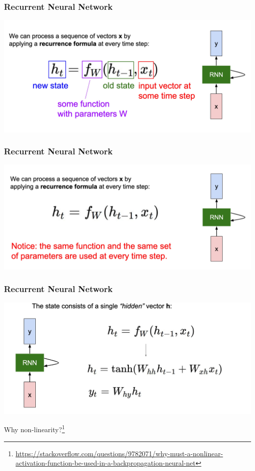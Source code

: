 \documentclass[aspectratio=1610]{beamer} %
\begin{document}
\begin{frame}

\frametitle{Recurrent Neural Network}

\begin{center}
\includegraphics[width=1\textwidth]{pics/rnnhow3}
\end{center}

\end{frame}


\begin{frame}

\frametitle{Recurrent Neural Network}

\begin{center}
\includegraphics[width=\textwidth]{pics/rnnhow4}
\end{center}

\end{frame}


\begin{frame}

\frametitle{Recurrent Neural Network}

\begin{center}
\includegraphics[width=\textwidth]{pics/rnnhow5}
\end{center}

Why non-linearity?\footnote{\url{https://stackoverflow.com/questions/9782071/why-must-a-nonlinear-activation-function-be-used-in-a-backpropagation-neural-net}}

\end{frame}
\end{document}
